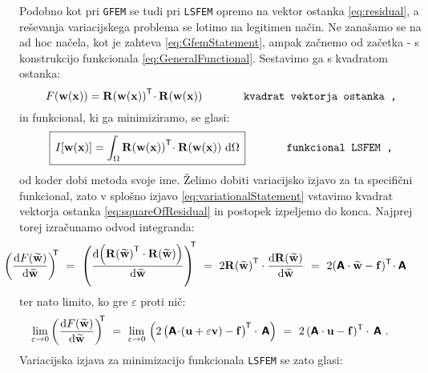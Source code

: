 Podobno kot pri \texttt{GFEM} se tudi pri \texttt{LSFEM} opremo na vektor ostanka \eqref{eq:residual}, a reševanja variacijskega problema se lotimo na legitimen način. Ne zanašamo se na ad hoc načela, kot je zahteva \eqref{eq:GfemStatement}, ampak začnemo od začetka - s konstrukcijo funkcionala \eqref{eq:GeneralFunctional}. Sestavimo ga s kvadratom ostanka:
\begin{equation}
	F(\mathbf{w(x)}) = \mathbf{R(w(x))}^\mathsf{T} \! \cdot \mathbf{R(w(x))} \hspace{1.3cm} \texttt{kvadrat vektorja ostanka ,}
	\label{eq:squareOfResidual}
\end{equation}
in funkcional, ki ga minimiziramo, se glasi:
\begin{equation}
	\boxed{\, I[\mathbf{w(x)}] = \int_{\Omega} \mathbf{R(w(x))}^\mathsf{T} \! \cdot \mathbf{R(w(x))} \ \mathrm{d} \Omega \,} \hspace{1.3cm} \texttt{funkcional LSFEM ,}
\end{equation}
od koder dobi metoda svoje ime. Želimo dobiti variacijsko izjavo za ta specifični funkcional, zato v splošno izjavo \eqref{eq:variationalStatement} vstavimo kvadrat vektorja ostanka \eqref{eq:squareOfResidual} in postopek izpeljemo do konca. Najprej torej izračunamo odvod integranda:
\begin{equation}
	\hspace{-10mm}
	\left(\frac{\ud F(\widetilde{\mathbf{w}})}{\ud \widetilde{\mathbf{w}}}\right)^\mathsf{\mkern-7mu T} \ = \
	\left(\frac{\ud \! \left(\mathbf{R(\widetilde{w})}^\mathsf{T} \cdot \mathbf{R(\widetilde{w})}\right)}{\ud \mathbf{\widetilde{w}}}\right)^\mathsf{\mkern-7mu T} \ = \
	2 \mathbf{R(\widetilde{w})}^\mathsf{T} \cdot \frac{\ud \mathbf{R(\widetilde{w})}}{\ud \mathbf{\widetilde{w}}} \ = \
	2 (\mathbsf{A} \cdot \mathbf{\widetilde{w}} - \mathbf{f})^\mathsf{T} \! \cdot \mathbsf{A}
\end{equation}
ter nato limito, ko gre $\varepsilon$ proti nič:
\begin{equation}
	\hspace{-7mm}
	\lim_{\varepsilon \rightarrow 0} \left(\frac{\ud F(\widetilde{\mathbf{w}})}{\ud \widetilde{\mathbf{w}}}\right)^\mathsf{\mkern-7mu T} \ = \
	\lim_{\varepsilon \rightarrow 0} \, \Big(2 \, \big(\mathbsf{A} \! \cdot \! (\mathbf{u} + \varepsilon \mathbf{v}) - \mathbf{f}\big)^\mathsf{\mkern-2mu T} \cdot \, \mathbsf{A}\Big) \ = \
	2 \, (\mathbsf{A} \cdot \mathbf{u} - \mathbf{f})^\mathsf{T} \cdot \, \mathbsf{A} \ .
\end{equation}
Variacijska izjava za minimizacijo funkcionala \texttt{LSFEM} se zato glasi:

